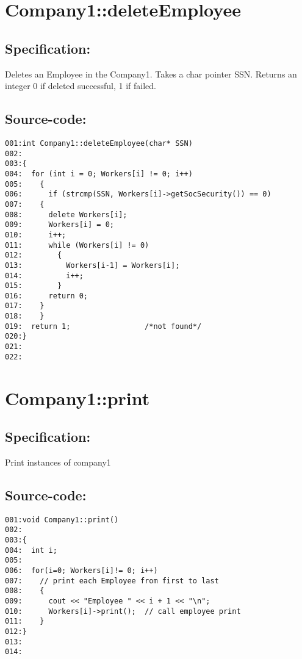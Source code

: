 \section{Company1::deleteEmployee}
\subsection*{Specification:}
Deletes an Employee in the Company1.
  Takes a char pointer SSN.
  Returns an integer 0 if deleted successful, 1 if failed.
\subsection*{Source-code:}
\begin{verbatim}
001:int Company1::deleteEmployee(char* SSN)
002:  
003:{
004:  for (int i = 0; Workers[i] != 0; i++)
005:    { 
006:      if (strcmp(SSN, Workers[i]->getSocSecurity()) == 0)  
007:    { 
008:      delete Workers[i];
009:      Workers[i] = 0;
010:      i++;
011:      while (Workers[i] != 0)     
012:        { 
013:          Workers[i-1] = Workers[i];          
014:          i++;
015:        }
016:      return 0; 
017:    }
018:    }   
019:  return 1;                 /*not found*/
020:}
021:
022:
\end{verbatim}
\section{Company1::print}
\subsection*{Specification:}
Print instances of company1
\subsection*{Source-code:}
\begin{verbatim}
001:void Company1::print() 
002:
003:{
004:  int i;
005:
006:  for(i=0; Workers[i]!= 0; i++)
007:    // print each Employee from first to last
008:    {
009:      cout << "Employee " << i + 1 << "\n";
010:      Workers[i]->print();  // call employee print
011:    }
012:}
013:
014:
\end{verbatim}
